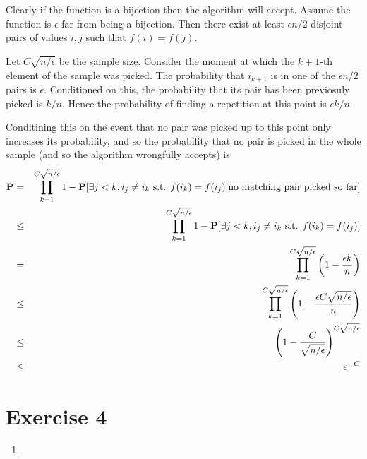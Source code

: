\documentclass[11pt]{article} \usepackage{amssymb}
\begin{document}
\begin{enumerate}
  Clearly if the function is a bijection then the algorithm will accept.
  Assume the function is $\epsilon$-far from being a bijection. Then there exist
  at least $\epsilon n/2$ disjoint pairs of values $i,j$ such that
  $f(i)=f(j)$. 

  Let $C\sqrt{n/\epsilon}$ be the sample size.
  Consider the moment at which the $k+1$-th element of the sample was picked.
  The probability that $i_{k+1}$ is in one of the $\epsilon n/2$ pairs is 
  $\epsilon$. Conditioned on this, the probability that its pair has been
  previosuly picked is $k/n$. Hence the probability of finding a repetition 
  at this point is $\epsilon k/n$. 
  
  Conditining this on the event that no pair
  was picked up to this point only increases its probability, and so the 
  probability that no pair
  is picked in the whole sample (and so the algorithm wrongfully accepts) is
  \begin{eqnarray*}
  \P &=& \prod_{k=1}^{C\sqrt{n/\epsilon}}1-\P[\mbox{$\exists j<k, i_j\neq i_k$ s.t. $f(i_k)=f(i_j)$}|\mbox{no matching pair picked so far}]
  \\ &\leq& \prod_{k=1}^{C\sqrt{n/\epsilon}}1-\P[\mbox{$\exists j<k, i_j\neq i_k$ s.t. $f(i_k)=f(i_j)$}]
  \\ &=&\prod_{k=1}^{C\sqrt{n/\epsilon}}\left(1-{\epsilon k\over n}\right)  
  \\ &\leq& \prod_{k=1}^{C\sqrt{n/\epsilon}}\left(1-{\epsilon C\sqrt{n/\epsilon}\over n}\right)  
  \\ &\leq& \left(1-{C\over \sqrt{n/\epsilon}}\right)^{C\sqrt{n/\epsilon}}  
  \\ &\leq& e^{-C}
  \end{eqnarray*}

\end{enumerate}
\section{Exercise 4}
\begin{enumerate}
  \item 

\end{enumerate}
\end{document}
